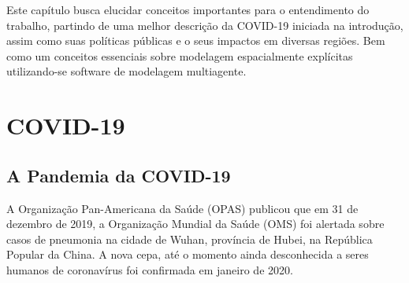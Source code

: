 \newcommand{\texCommand}[1]{\texttt{\textbackslash{#1}}}%

\newcommand{\exemplo}[1]{%
\vspace{\baselineskip}%
\noindent\fbox{\begin{minipage}{\textwidth}#1\end{minipage}}%
\\\vspace{\baselineskip}}%

\newcommand{\exemploVerbatim}[1]{%
\vspace{\baselineskip}%
\noindent\fbox{\begin{minipage}{\textwidth}%
#1\end{minipage}}%
\\\vspace{\baselineskip}}%


Este capítulo busca elucidar conceitos importantes para o entendimento do trabalho, partindo de uma melhor descrição da COVID-19 iniciada na introdução, assim como suas políticas públicas e o seus impactos em diversas regiões. Bem como um conceitos essenciais sobre modelagem espacialmente explícitas utilizando-se software de modelagem multiagente.

\section{COVID-19}

\subsection{A Pandemia da COVID-19}

A Organização Pan-Americana da Saúde (OPAS) publicou que em 31 de dezembro de 2019, a Organização Mundial da Saúde (OMS) foi alertada sobre casos de pneumonia na cidade de Wuhan, província de Hubei, na República Popular da China. A nova cepa, até o momento ainda desconhecida a seres humanos de coronavírus foi confirmada em janeiro de 2020.

